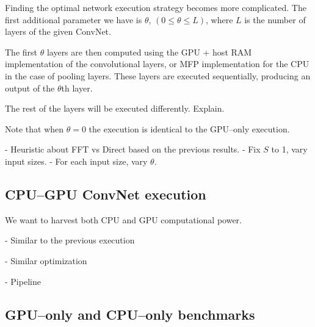 \documentclass[conference]{IEEEtran}
\begin{document}
  Finding the optimal network execution strategy becomes more
  complicated.  The first additional parameter we have is $\theta$,
  $(0 \le \theta \le L)$, where $L$ is the number of layers of the
  given ConvNet.

  The first $\theta$ layers are then computed using the GPU + host RAM
  implementation of the convolutional layers, or MFP implementation
  for the CPU in the case of pooling layers.  These layers are
  executed sequentially, producing an output of the $\theta$th layer.

  The rest of the layers will be executed differently.  Explain.

  Note that when $\theta = 0$ the execution is identical to the
  GPU--only execution.

  - Heuristic about FFT vs Direct based on the previous results.
  - Fix $S$ to 1, vary input sizes.
  - For each input size, vary $\theta$.

\subsection{CPU--GPU ConvNet execution}

  We want to harvest both CPU and GPU computational power.

  - Similar to the previous execution

  - Similar optimization

  - Pipeline

\subsection{GPU--only and CPU--only benchmarks}
\end{document}

